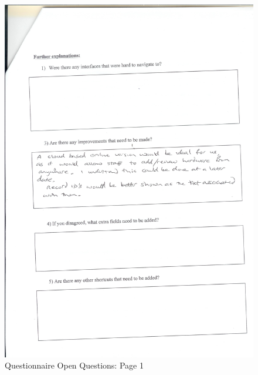 \begin{figure}[H]
    \includegraphics[width=\textwidth]{./Evaluation/EvaluationQuestionnaire/Scan12.jpeg}
    \caption{Questionnaire Open Questions: Page 1} 
\end{figure}

